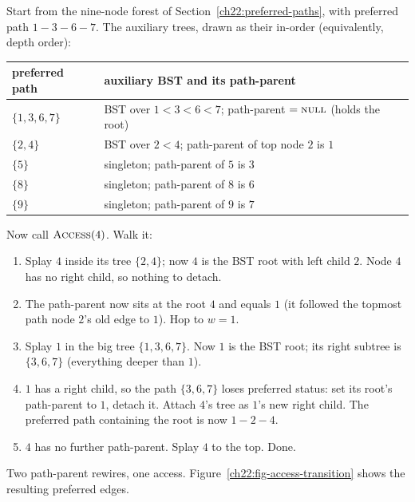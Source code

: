 \begin{labbox}
Start from the nine-node forest of Section~\ref{ch22:preferred-paths}, with
preferred path $1\!-\!3\!-\!6\!-\!7$. The auxiliary trees, drawn as their in-order
(equivalently, depth order):

\begin{center}
\begin{tabular}{ll}
\toprule
preferred path & auxiliary BST and its path-parent\\
\midrule
$\{1,3,6,7\}$ & BST over $1<3<6<7$; path-parent $=\textsc{null}$ (holds the root)\\
$\{2,4\}$     & BST over $2<4$; path-parent of top node $2$ is $1$\\
$\{5\}$       & singleton; path-parent of $5$ is $3$\\
$\{8\}$       & singleton; path-parent of $8$ is $6$\\
$\{9\}$       & singleton; path-parent of $9$ is $7$\\
\bottomrule
\end{tabular}
\end{center}

Now call $\textsc{Access}(4)$. Walk it:
\begin{enumerate}
  \item Splay $4$ inside its tree $\{2,4\}$; now $4$ is the BST root with left
        child $2$. Node $4$ has no right child, so nothing to detach.
  \item The path-parent now sits at the root $4$ and equals $1$ (it followed the
        topmost path node $2$'s old edge to $1$). Hop to $w=1$.
  \item Splay $1$ in the big tree $\{1,3,6,7\}$. Now $1$ is the BST root; its
        right subtree is $\{3,6,7\}$ (everything deeper than $1$).
  \item $1$ has a right child, so the path $\{3,6,7\}$ loses preferred status:
        set its root's path-parent to $1$, detach it. Attach $4$'s tree as $1$'s
        new right child. The preferred path containing the root is now
        $1\!-\!2\!-\!4$.
  \item $4$ has no further path-parent. Splay $4$ to the top. Done.
\end{enumerate}
Two path-parent rewires, one access. Figure~\ref{ch22:fig-access-transition} shows the resulting preferred edges.
\end{labbox}

